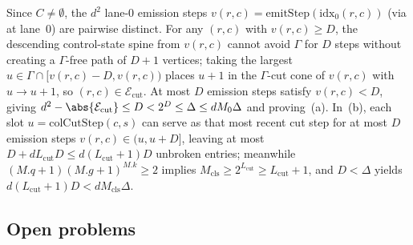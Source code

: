 \begin{outline}
Since $C \ne \emptyset$, the $d^2$ lane-$0$ emission steps $v(r,c) = \mathrm{emitStep}(\mathrm{idx}_0(r,c))$
(via  at lane~$0$)
are pairwise distinct. For any $(r,c)$ with $v(r,c) \ge D$, the descending control-state spine from
$v(r,c)$ cannot avoid $\Gamma$ for $D$ steps without creating a $\Gamma$-free path of $D + 1$
vertices; taking the largest $u \in \Gamma \cap [v(r,c) - D, v(r,c))$ places $u + 1$ in the
$\Gamma$-cut cone of $v(r,c)$ with $u \to u + 1$, so $(r,c) \in \mathcal{E}_{\mathrm{cut}}$. At most
$D$ emission steps satisfy $v(r,c) < D$, giving $d^2 - \abs{\mathcal{E}_{\mathrm{cut}}} \le D <
2^D \le \Delta \le d M_0 \Delta$ and proving~(a). In~(b), each slot $u = \mathrm{colCutStep}(c, s)$
can serve as that most recent cut step for at most $D$ emission steps $v(r,c) \in (u, u + D]$, leaving
at most $D + d L_{\mathrm{cut}} D \le d(L_{\mathrm{cut}} + 1)D$ unbroken entries; meanwhile
$(M.q + 1)(M.g + 1)^{M.k} \ge 2$ implies $M_{\mathrm{cls}} \ge 2^{L_{\mathrm{cut}}} \ge L_{\mathrm{cut}} + 1$,
and $D < \Delta$ yields $d(L_{\mathrm{cut}} + 1)D < d M_{\mathrm{cls}} \Delta$.
\end{outline}

\subsection{Open problems}\label{sec:open}

